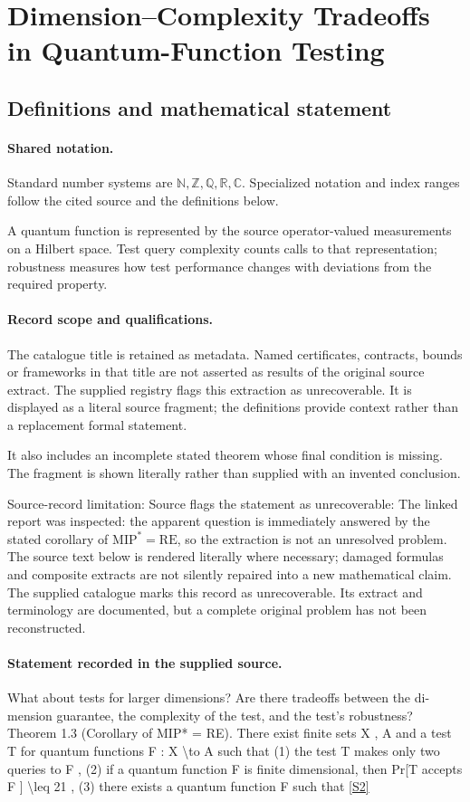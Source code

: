 \documentclass[11pt]{article}
\newcommand{\sref}[2]{\hyperlink{source:#1:#2}{[S#2]}}
\begin{document}
\section{Dimension–Complexity Tradeoffs in Quantum-Function Testing}\label{statement}

\subsection{Definitions and mathematical statement}

\paragraph{Shared notation.}Standard number systems are $\mathbb N,\mathbb Z,\mathbb Q,\mathbb R,\mathbb C$. Specialized notation and index ranges follow the cited source and the definitions below.


A quantum function is represented by the source operator-valued measurements on a Hilbert space. Test query complexity counts calls to that representation; robustness measures how test performance changes with deviations from the required property.
\paragraph{Record scope and qualifications.}
The catalogue title is retained as metadata. Named certificates, contracts, bounds or frameworks in that title are not asserted as results of the original source extract.
The supplied registry flags this extraction as unrecoverable. It is displayed as a literal source fragment; the definitions provide context rather than a replacement formal statement.

It also includes an incomplete stated theorem whose final condition is missing. The fragment is shown literally rather than supplied with an invented conclusion.

Source-record limitation: Source flags the statement as unrecoverable: The linked report was inspected: the apparent question is immediately answered by the stated corollary of $\mathrm{MIP}^*=\mathrm{RE}$, so the extraction is not an unresolved problem.
The source text below is rendered literally where necessary; damaged formulas and composite extracts are not silently repaired into a new mathematical claim.
The supplied catalogue marks this record as unrecoverable. Its extract and terminology are documented, but a complete original problem has not been reconstructed.
\paragraph{Statement recorded in the supplied source.}
What about tests for larger dimensions? Are there tradeoffs between the di- mension guarantee, the complexity of the test, and the test’s robustness? Theorem 1.3 (Corollary of MIP* = RE). There exist finite sets X , A and a test T for quantum functions F : X \textbackslash{}to A such that (1) the test T makes only two queries to F , (2) if a quantum function F is finite dimensional, then Pr[T accepts F ] \textbackslash{}leq 21 , (3) there exists a quantum function F such that \sref{statement}{2}
\end{document}
